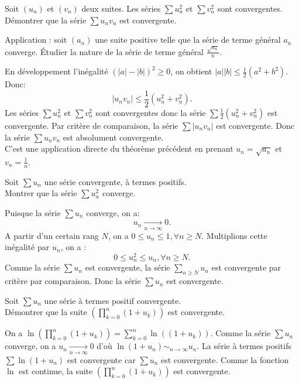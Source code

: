 \documentclass{book}
\begin{document}
\begin{Exercice}
Soit $(u_n)$ et $(v_n)$ deux suites. Les séries $\sum u_n ^2$ et $\sum v_n ^2$ sont convergentes.\\ 
Démontrer que la série $\sum u_n v_n$ est convergente.




Application : soit $(a_n)$ une suite positive telle que la série de terme général $a_n$ converge. Étudier la nature de la série de terme général $\frac{\sqrt{a_n}}{n}$.
\begin{Correction}
En développement l'inégalité $(|a|-|b|)^2\geq 0$, on obtient $|a||b|\leq \frac{1}{2}(a^2+b^2)$. Donc: 
$$|u_nv_n|\leq  \frac{1}{2}(u_n^2+v_n^2).$$
Les séries $\sum u_n ^2$ et $\sum v_n ^2$ sont convergentes donc la série $\sum \frac{1}{2}(u_n^2+v_n^2)$ est convergente. Par critère de comparaison, la série $\sum |u_nv_n| $ est convergente. Donc la série $\sum u_nv_n $ est absolument convergente.\\
C'est une application directe du théorème précédent en prenant $u_n=\sqrt{a_n}$ et $v_n=\frac{1}{n}$. 
\end{Correction}
\end{Exercice}

\begin{Exercice}[convergence]
Soit $\sum u_n$  une série convergente, à 
termes positifs.\\ 
Montrer que la série $\sum u_n^2$ converge. 
\begin{Correction}
Puisque la série  $\sum u_n$ converge, on a: 
$$ u_n \xrightarrow[n\to\infty]{}0.$$ 
A partir d'un certain rang $N$, on a  $0 \leq u_n \leq 1 ,\forall n\geq N.$  
Multiplions cette inégalité par $u_n$, on a :
$$0 \leq u_n^2 \leq u_n ,\forall n\geq N.$$
Comme la série $\sum u_n$ est convergente, la série $\sum_{n\geq N} u_n$ est convergente par critère par comparaison. Donc la série $\sum u_n$  est convergente.
\end{Correction}
\end{Exercice}

\begin{Exercice}[Convergence]
Soit $\sum u_n$ une série à termes positif convergente.\\ 
Démontrer que la suite $\left(\prod_{k=0}^n (1+u_k)\right)$ est convergente.
\begin{Correction}
On a $\ln(\prod_{k=0}^n (1+u_k))=\sum_{k=0}^n \ln( (1+u_k))$. 
Comme la série $\sum u_n$ converge, on a $u_n\xrightarrow[n\to\infty]{}0$ d'où $\ln(1+u_n)\sim_{n\to\infty}u_n$. La série à  termes positifs  $\sum \ln (1+u_n)$ est convergente car $\sum u_n$ est convergente. Comme la fonction $\ln$ est continue, la suite $\left(\prod_{k=0}^n (1+u_k)\right)$ est convergente.
\end{Correction}
\end{Exercice}
\end{document}
